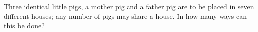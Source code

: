 Three identical little pigs, a mother pig and a father pig are to be placed in seven different houses; any number of pigs may share a house. In how many ways can this be done?
